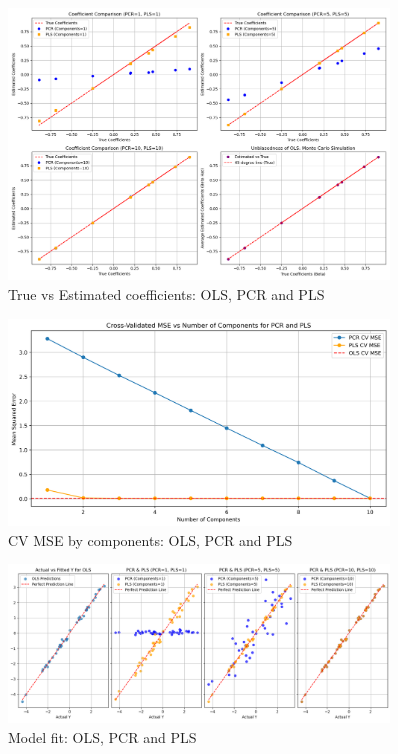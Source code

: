 \documentclass[11pt,twoside,a4paper]{article}
\begin{document}
\begin{figure}[H]
    \centering
    \includegraphics[width=0.9\textwidth]{First_plot.png}
    \caption{True vs Estimated coefficients: OLS, PCR and PLS}
    \label{fig:Classic_data_analysis}
\end{figure}

\begin{figure}[H]
    \centering
    \includegraphics[width=0.9\textwidth]{Second_plot.png}
    \caption{CV MSE by components: OLS, PCR and PLS}
    \label{fig:Classic_data_analysis}
\end{figure}

\begin{figure}[H]
    \centering
    \includegraphics[width=0.9\textwidth]{Third_plot.png}
    \caption{Model fit: OLS, PCR and PLS}
    \label{fig:Classic_data_analysis}
\end{figure}
\end{document}
